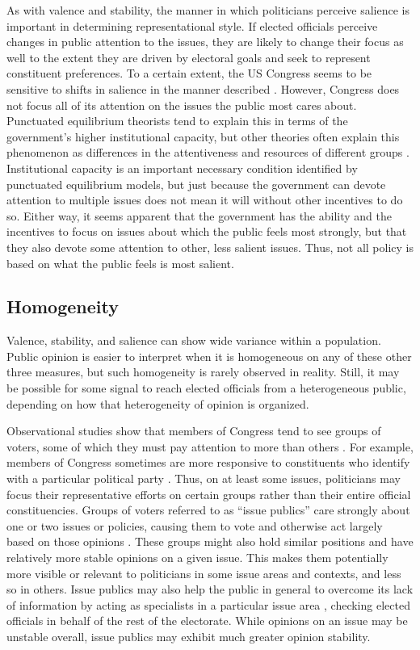 As with valence and stability, the manner in which politicians perceive salience is important in determining representational style. If elected officials perceive changes in public attention to the issues, they are likely to change their focus as well to the extent they are driven by electoral goals and seek to represent constituent preferences. To a certain extent, the US Congress seems to be sensitive to shifts in salience in the manner described \citep{Jones2005}. However, Congress does not focus all of its attention on the issues the public most cares about. Punctuated equilibrium theorists \citep{Jones2005,True1999} tend to explain this in terms of the government's higher institutional capacity, but other theories often explain this phenomenon as differences in the attentiveness and resources of different groups \citep{Lindblom1965,Sabatier1988}. Institutional capacity is an important necessary condition identified by punctuated equilibrium models, but just because the government can devote attention to multiple issues does not mean it will without other incentives to do so. Either way, it seems apparent that the government has the ability and the incentives to focus on issues about which the public feels most strongly, but that they also devote some attention to other, less salient issues. Thus, not all policy is based on what the public feels is most salient.

\subsection*{Homogeneity}
Valence, stability, and salience can show wide variance within a population. Public opinion is easier to interpret when it is homogeneous on any of these other three measures, but such homogeneity is rarely observed in reality. Still, it may be possible for some signal to reach elected officials from a heterogeneous public, depending on how that heterogeneity of opinion is organized.

Observational studies show that members of Congress tend to see groups of voters, some of which they must pay attention to more than others \citep{Fenno1977}. For example, members of Congress sometimes are more responsive to constituents who identify with a particular political party \citep{Clinton2006}. Thus, on at least some issues, politicians may focus their representative efforts on certain groups rather than their entire official constituencies. Groups of voters referred to as ``issue publics'' care strongly about one or two issues or policies, causing them to vote and otherwise act largely based on those opinions \citep{Converse1964,Krosnick1990}. These groups might also hold similar positions and have relatively more stable opinions on a given issue. This makes them potentially more visible or relevant to politicians in some issue areas and contexts, and less so in others. Issue publics may also help the public in general to overcome its lack of information by acting as specialists in a particular issue area \citep{Hutchings2011}, checking elected officials in behalf of the rest of the electorate. While opinions on an issue may be unstable overall, issue publics may exhibit much greater opinion stability.

